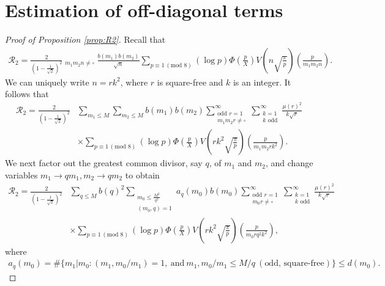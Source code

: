 \documentclass[12pt,reqno]{amsart}
\numberwithin{equation}{section}
\theoremstyle{plain}
\theoremstyle{definition}
\theoremstyle{remark}
\begin{document}
\section{Estimation of off-diagonal terms}
\label{proofofprop2}
\begin{proof}[Proof of Proposition \ref{prop:R2}]
Recall that
\begin{align*}
    \mathcal{R}_2=\frac{2}{\left( 1-\frac{1}{\sqrt{2}}\right)^2}\mathop{\sum_{m_1\leq M} \sum_{m_2\leq M} \sum_{\substack{\textrm{odd }n=1 }}^{\infty}}_{m_1m_2n \neq \square} \frac{b(m_1)b(m_2)}{\sqrt{n}}   \sum_{p\equiv 1 \, (\text{mod }8) } (\log p) \Phi\left(\frac{p}{X}\right)V\left( n\sqrt{\frac{\pi}{p}}\right) \left(\frac{p}{m_1m_2n}\right).
\end{align*}
We can uniquely write $n = rk^2$, where $r$ is square-free and $k$ is an integer. It follows that
\begin{align*}
    \mathcal{R}_2=\frac{2}{\left( 1-\frac{1}{\sqrt{2}}\right)^2} &\sum_{m_1\leq M} \sum_{m_2\leq M} b(m_1)b(m_2) \sum_{\substack{\textrm{odd } r=1 \\ m_1m_2r \neq \square}}^{\infty} \sum_{\substack{k=1 \\ k \text{ odd}}}^{\infty} \frac{{\mu (r)}^2}{k \sqrt{r}} \\
    &\times\sum_{p\equiv 1 \, (\text{mod }8) } (\log p) \Phi\left(\frac{p}{X}\right)V\left( rk^2\sqrt{\frac{\pi}{p}}\right) \left(\frac{p}{m_1m_2rk^2}\right).
\end{align*}
We next factor out the greatest common divisor, say $q$, of $m_1$ and $m_2$, and change variables $m_1 \rightarrow qm_1, m_2 \rightarrow qm_2$ to obtain
\begin{align*}
    \mathcal{R}_2=\frac{2}{\left( 1-\frac{1}{\sqrt{2}}\right)^2} &\sum_{q\leq M} b(q)^2 \sum_{\substack{m_0\leq \frac{M^2}{q^2}\\ (m_0,q)=1}} a_q(m_0)b(m_0) \sum_{\substack{\textrm{odd } r=1 \\ m_0r \neq \square }}^{\infty} \sum_{\substack{k=1 \\ k \text{ odd}}}^{\infty} \frac{{\mu (r)}^2}{k \sqrt{r}} \\
    &\times\sum_{p\equiv 1 \, (\text{mod }8) } (\log p) \Phi\left(\frac{p}{X}\right)V\left( rk^2\sqrt{\frac{\pi}{p}}\right) \left(\frac{p}{m_0rq^2k^2}\right),
\end{align*}
where
\begin{align*}
a_q(m_0) = \#\{m_1 | m_0 : (m_1, m_0 / m_1) = 1,~\textrm{and}~m_1, m_0/m_1 \leq M/q~(\textrm{odd, square-free})\}\leq d(m_0).

\end{align*}
\end{proof}
\end{document}

